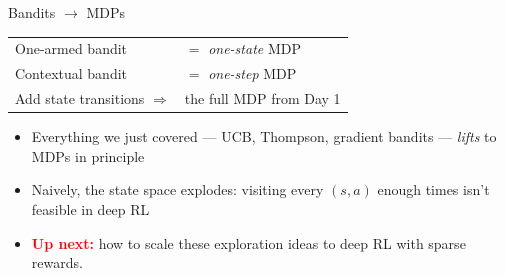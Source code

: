\begin{frame}{Bandits $\longrightarrow$ MDPs}
\begin{center}
\renewcommand{\arraystretch}{1.5}
\large
\begin{tabular}{ll}
One-armed bandit     & $=$ \emph{one-state} MDP \\
Contextual bandit    & $=$ \emph{one-step} MDP \\
Add state transitions $\Longrightarrow$ & the full MDP from Day 1 \\
\end{tabular}
\end{center}
\vspace{0.8em}
\begin{itemize}
    \setlength{\itemsep}{0.5em}
    \item Everything we just covered --- UCB, Thompson, gradient bandits --- \emph{lifts} to MDPs in principle
    \item Naively, the state space explodes: visiting every $(s, a)$ enough times isn't feasible in deep RL
    \item \textcolor{red}{\textbf{Up next:}} how to scale these exploration ideas to deep RL with sparse rewards.
\end{itemize}
\end{frame}
